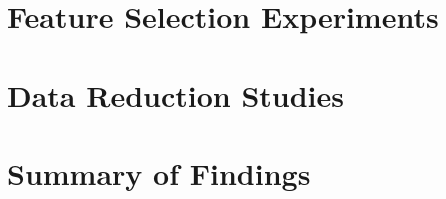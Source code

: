 

\section{Feature Selection Experiments}
\label{sec:pmc-results-feature-selection-experiments}


\section{Data Reduction Studies}
\label{sec:pmc-results-data-reduction-studies}


\section{Summary of Findings}
\label{sec:pmc-results-summary-of-findings}
